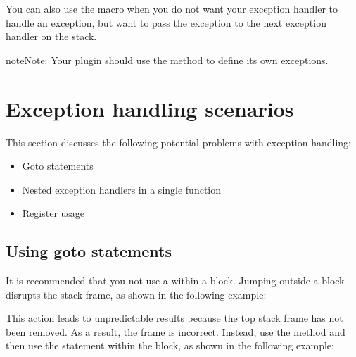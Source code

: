 \documentclass[letterpaper,12pt,english,openany,oneside]{sphinxmanual}
\begin{document}
You can also use the  macro when you do not want your exception handler to handle an exception, but want to pass the exception to the next exception handler on the stack.

\begin{sphinxadmonition}{note}{Note:}
Your plugin should use the  method to define its own exceptions.
\end{sphinxadmonition}


\section{Exception handling scenarios}
\label{\detokenize{Plugins_Exceptions:exception-handling-scenarios}}
This section discusses the following potential problems with exception handling:
\begin{itemize}
\item {} 
Goto statements

\item {} 
Nested exception handlers in a single function

\item {} 
Register usage

\end{itemize}


\subsection{Using goto statements}
\label{\detokenize{Plugins_Exceptions:using-goto-statements}}
It is recommended that you not use a  within a  block. Jumping outside a  block disrupts the stack frame, as shown in the following example:

\begin{sphinxVerbatim}[commandchars=\\\{\}]
      
\end{sphinxVerbatim}

This action leads to unpredictable results because the top stack frame has not been removed. As a result, the frame is incorrect. Instead, use the  method and then use the  statement within the  block, as shown in the following example:
\end{document}
